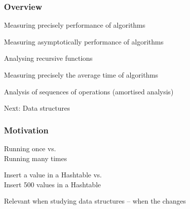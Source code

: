 \documentclass[aspectratio=169]{beamer}
\begin{document}
\frame[plain]{\titlepage}


\begin{frame}[t]\frametitle{Overview}


  \begin{itemize}
    {\color{black!25}
    \item Measuring {precisely} performance of algorithms
    \item Measuring {asymptotically} performance of algorithms
    \item Analysing {recursive} functions
    \item Measuring {precisely} the {average time} of algorithms}
    \item Analysis of sequences of operations (\alert{amortised analysis})
    {\color{black!25}
    \item Next: Data structures
    }
  \end{itemize}
\end{frame}


\begin{frame}\frametitle{Motivation}
  \centering

  \begin{block}{}
    Running once \alert{vs.}\\
    Running many times
  \end{block}

  \begin{block}{}
    Insert a value in a Hashtable \alert{vs.}\\
    Insert 500 values in a Hashtable
  \end{block}

  \bigskip
  {\Large Relevant when studying data structures -- when the  changes}


\end{frame}



\end{document}
